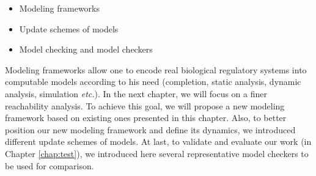 \begin{itemize}
    \item Modeling frameworks
    \item Update schemes of models
    \item Model checking and model checkers
\end{itemize}

Modeling frameworks allow one to encode real biological regulatory systems into computable models according to his need (completion, static analysis, dynamic analysis, simulation \textit{etc.}).
In the next chapter, we will focus on a finer reachability analysis.
To achieve this goal, we will propose a new modeling framework based on existing ones presented in this chapter.
Also, to better position our new modeling framework and define its dynamics, we introduced different update schemes of models.
At last, to validate and evaluate our work (in Chapter \ref{chap:test}), we introduced here several representative model checkers to be used for comparison.